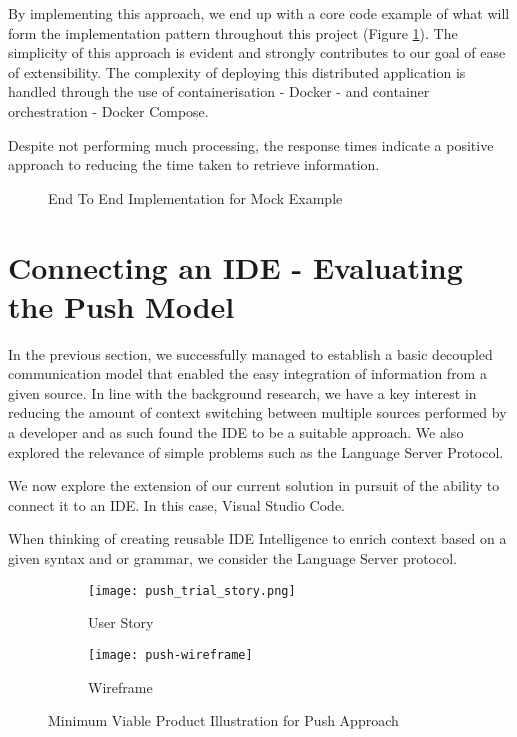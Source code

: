 By implementing this approach, we end up with a core code example of what will form the implementation pattern throughout this project (Figure \ref{fig:e2eMockClass}). The simplicity of this approach is evident and strongly contributes to our goal of ease of extensibility. The complexity of deploying this distributed application is handled through the use of containerisation - Docker - and container orchestration - Docker Compose. 

Despite not performing much processing, the response times indicate a positive approach to reducing the time taken to retrieve information.



\begin{figure}[h!]
	\centering
	
	\caption{End To End Implementation for Mock Example}
	\label{fig:e2eMockClass}
\end{figure}

\section{Connecting an IDE - Evaluating the Push Model}

In the previous section, we successfully managed to establish a basic decoupled communication model that enabled the easy integration of information from a given source. In line with the background research, we have a key interest in reducing the amount of context switching between multiple sources performed by a developer and as such found the IDE to be a suitable approach. We also explored the relevance of simple problems such as the Language Server Protocol. 

We now explore the extension of our current solution in pursuit of the ability to connect it to an IDE. In this case, Visual Studio Code. 

When thinking of creating reusable IDE Intelligence to enrich context based on a given syntax and or grammar, we consider the Language Server protocol. 

\begin{figure}[h!]
	\centering
	\begin{subfigure}[t]{0.3\textwidth}
		\texttt{[image: push\_trial\_story.png]}
		\caption{User Story}
	\end{subfigure}
	\begin{subfigure}[t]{0.6\textwidth}
		\texttt{[image: push-wireframe]}
		\caption{Wireframe}
	\end{subfigure}
	\label{fig:mvpPush}
	\caption{Minimum Viable Product Illustration for Push Approach}
\end{figure}

